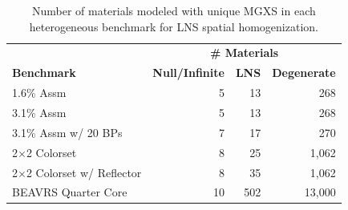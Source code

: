 \begin{table}[h!]
  \centering
  \caption[Number of materials for LNS spatial homogenization]{Number of materials modeled with unique \ac{MGXS} in each heterogeneous benchmark for \ac{LNS} spatial homogenization.}
  \small
  \label{table:chap9-num-materials-lns}
  \vspace{6pt}
  \begin{tabular}{l r r r}
  \toprule
  \rowcolor{lightgray}
  & \multicolumn{3}{c}{\cellcolor{lightgray} \bf \# Materials} \\
  \multirow{-2}{*}{\cellcolor{lightgray} \bf Benchmark} &
  \multicolumn{1}{c}{\cellcolor{lightgray} \bf Null/Infinite} &
  \multicolumn{1}{c}{\cellcolor{lightgray} \bf \ac{LNS}} &
  \multicolumn{1}{c}{\cellcolor{lightgray} \bf Degenerate} \\
  \midrule
1.6\% Assm & 5 & 13 & 268 \\
  \midrule
3.1\% Assm & 5 & 13 & 268 \\
  \midrule
3.1\% Assm w/ 20 BPs & 7 & 17 & 270  \\
  \midrule
2$\times$2 Colorset & 8 & 25 & 1,062 \\
  \midrule
2$\times$2 Colorset w/ Reflector & 8 & 35 & 1,062 \\
  \midrule
\ac{BEAVRS} Quarter Core & 10 & 502 & 13,000 \\ %
  \bottomrule
\end{tabular}
\end{table}

